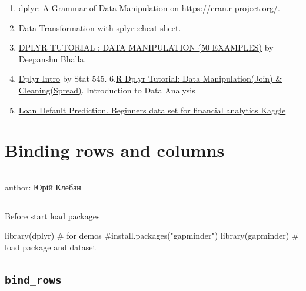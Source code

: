 \documentclass[
  letterpaper,
  DIV=11,
  numbers=noendperiod]{scrreprt}
\newenvironment{Shaded}{\begin{snugshade}}{\end{snugshade}}
\newcommand{\CommentTok}[1]{\textcolor[rgb]{0.37,0.37,0.37}{#1}}
\newcommand{\FunctionTok}[1]{\textcolor[rgb]{0.28,0.35,0.67}{#1}}
\newcommand{\NormalTok}[1]{\textcolor[rgb]{0.00,0.23,0.31}{#1}}
\providecommand{\tightlist}{%
  \setlength{\itemsep}{0pt}\setlength{\parskip}{0pt}}\usepackage{longtable,booktabs,array}
\begin{document}
\begin{enumerate}
\def\labelenumi{\arabic{enumi}.}
\tightlist
\item
  \href{https://cran.r-project.org/web/packages/dplyr/index.html}{dplyr:
  A Grammar of Data Manipulation} on https://cran.r-project.org/.
\item
  \href{https://github.com/rstudio/cheatsheets/blob/master/data-transformation.pdf}{Data
  Transformation with splyr::cheat sheet}.
\item
  \href{https://www.listendata.com/2016/08/dplyr-tutorial.html}{DPLYR
  TUTORIAL : DATA MANIPULATION (50 EXAMPLES)} by Deepanshu Bhalla.
\item
  \href{https://stat545.com/dplyr-intro.html}{Dplyr Intro} by Stat 545.
  6.\href{https://www.guru99.com/r-dplyr-tutorial.html}{R Dplyr
  Tutorial: Data Manipulation(Join) \& Cleaning(Spread)}. Introduction
  to Data Analysis
\item
  \href{https://www.kaggle.com/kmldas/loan-default-prediction}{Loan
  Default Prediction. Beginners data set for financial analytics Kaggle}
\end{enumerate}

\chapter{Binding rows and columns}\label{binding-rows-and-columns}

\begin{center}\rule{0.5\linewidth}{0.5pt}\end{center}

author: Юрій Клебан

\begin{center}\rule{0.5\linewidth}{0.5pt}\end{center}

Before start load packages

\begin{Shaded}
\begin{Highlighting}[]
\FunctionTok{library}\NormalTok{(dplyr) }\CommentTok{\# for demos}
\CommentTok{\#install.packages("gapminder")}
\FunctionTok{library}\NormalTok{(gapminder)  }\CommentTok{\# load package and dataset}
\end{Highlighting}
\end{Shaded}

\section{\texorpdfstring{\texttt{bind\_rows}}{bind\_rows}}\label{bind_rows}
\end{document}
